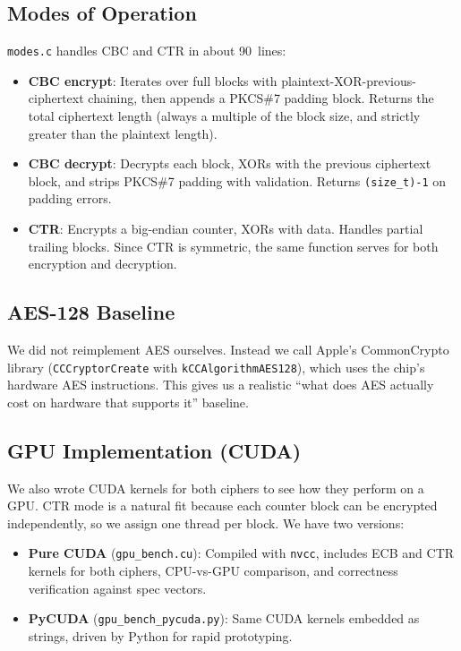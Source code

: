 \documentclass[conference]{IEEEtran}
\begin{document}
\subsection{Modes of Operation}

\texttt{modes.c} handles CBC and CTR in about 90~lines:

\begin{itemize}
\item \textbf{CBC encrypt}: Iterates over full blocks with
      plaintext-XOR-previous-ciphertext chaining, then appends a PKCS\#7
      padding block.  Returns the total ciphertext length (always a
      multiple of the block size, and strictly greater than the plaintext
      length).
\item \textbf{CBC decrypt}: Decrypts each block, XORs with the previous
      ciphertext block, and strips PKCS\#7 padding with validation.
      Returns \texttt{(size\_t)-1} on padding errors.
\item \textbf{CTR}: Encrypts a big-endian counter, XORs with data.
      Handles partial trailing blocks.  Since CTR is symmetric, the same
      function serves for both encryption and decryption.
\end{itemize}

\subsection{AES-128 Baseline}

We did not reimplement AES ourselves.  Instead we call Apple's
CommonCrypto library (\texttt{CCCryptorCreate} with
\texttt{kCCAlgorithmAES128}), which uses the chip's hardware AES
instructions.  This gives us a realistic ``what does AES actually cost
on hardware that supports it'' baseline.

\subsection{GPU Implementation (CUDA)}

We also wrote CUDA kernels for both ciphers to see how they perform
on a GPU.  CTR mode is a natural fit because each counter block can be
encrypted independently, so we assign one thread per block.
We have two versions:

\begin{itemize}
\item \textbf{Pure CUDA} (\texttt{gpu\_bench.cu}): Compiled with
      \texttt{nvcc}, includes ECB and CTR kernels for both ciphers,
      CPU-vs-GPU comparison, and correctness verification against spec
      vectors.
\item \textbf{PyCUDA} (\texttt{gpu\_bench\_pycuda.py}): Same CUDA kernels
      embedded as strings, driven by Python for rapid prototyping.
\end{itemize}
\end{document}
